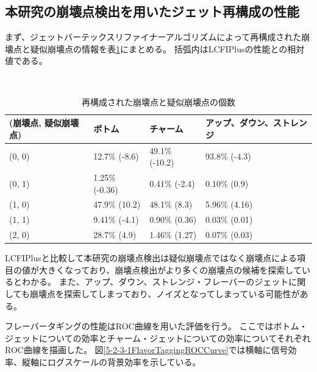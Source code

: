 \subsection{本研究の崩壊点検出を用いたジェット再構成の性能} \label{Com:FlaTagCom:PerformanceofFlavorTagging}

まず、ジェットバーテックスリファイナーアルゴリズムによって再構成された崩壊点と疑似崩壊点の情報を表\ref{TheNumberofReconstructedVertices}にまとめる。
括弧内はLCFIPlusの性能との相対値である。

\begin{table}[htb]
 \centering
　\small
  \begin{tabular}{l l l l}\hline
    (崩壊点, 疑似崩壊点) & ボトム & チャーム & アップ、ダウン、ストレンジ\\\hline\hline
    (0, 0) & 12.7\% (-8.6) & 49.1\% (-10.2) & 93.8\% (-4.3)\\
    (0, 1) & 1.25\% (-0.36) & 0.41\% (-2.4) & 0.10\% (0.9)\\
    (1, 0) & 47.9\% (10.2) & 48.1\% (8.3) & 5.96\% (4.16)\\
    (1, 1) & 9.41\% (-4.1) & 0.90\% (0.36) & 0.03\% (0.01)\\
    (2, 0) & 28.7\% (4.9) & 1.46\% (1.27) & 0.07\% (0.03)\\\hline
  \end{tabular}
  \caption{再構成された崩壊点と疑似崩壊点の個数}
  \label{TheNumberofReconstructedVertices}
\end{table}

LCFIPlusと比較して本研究の崩壊点検出は疑似崩壊点ではなく崩壊点による項目の値が大きくなっており、崩壊点検出がより多くの崩壊点の候補を探索しているとわかる。
また、アップ、ダウン、ストレンジ・フレーバーのジェットに関しても崩壊点を探索してしまっており、ノイズとなってしまっている可能性がある。

フレーバータギングの性能はROC曲線を用いた評価を行う。
ここではボトム・ジェットについての効率とチャーム・ジェットについての効率についてそれぞれROC曲線を描画した。
図\ref{5-2-3-1FlavorTaggingROCCurve}では横軸に信号効率、縦軸にログスケールの背景効率を示している。

